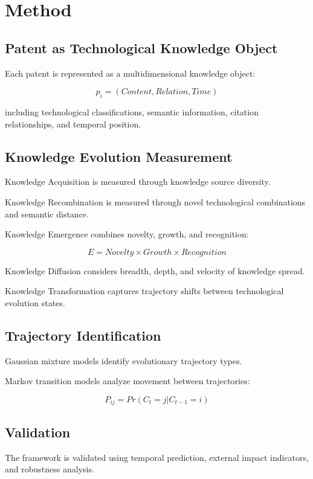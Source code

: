 
\section{Method}

\subsection{Patent as Technological Knowledge Object}

Each patent is represented as a multidimensional knowledge object:

\[
p_i=(Content,Relation,Time)
\]

including technological classifications, semantic information, citation relationships, and temporal position.

\subsection{Knowledge Evolution Measurement}

Knowledge Acquisition is measured through knowledge source diversity.

Knowledge Recombination is measured through novel technological combinations and semantic distance.

Knowledge Emergence combines novelty, growth, and recognition:

\[
E=Novelty \times Growth \times Recognition
\]

Knowledge Diffusion considers breadth, depth, and velocity of knowledge spread.

Knowledge Transformation captures trajectory shifts between technological evolution states.

\subsection{Trajectory Identification}

Gaussian mixture models identify evolutionary trajectory types.

Markov transition models analyze movement between trajectories:

\[
P_{ij}=Pr(C_t=j|C_{t-1}=i)
\]

\subsection{Validation}

The framework is validated using temporal prediction, external impact indicators, and robustness analysis.

